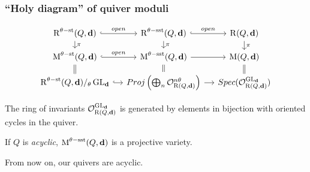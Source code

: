 \documentclass{beamer}
\begin{document}
\begin{frame}
    \frametitle{``Holy diagram'' of quiver moduli}
    \[\begin{tikzcd}[row sep=small, column sep=small, ampersand replacement=\&]
        \parameterspace^{\theta\stable}(Q, \tuple{d}) \arrow[r, hook, "open"] \arrow[d, "\pi"]   \& \parameterspace^{\theta\semistable}(Q, \tuple{d}) \arrow[r, hook, "open"] \arrow[d, "\pi"]                                   \& \parameterspace(Q, \tuple{d}) \arrow[d, "\pi"] \\ 
        \modulispace^{\theta\stable}(Q, \tuple{d}) \arrow[r, hook, "open"] \arrow[d, equal]    \&  \modulispace^{\theta\semistable}(Q, \tuple{d}) \arrow[r] \arrow[d, equal]                                       \& \modulispace(Q, \tuple{d}) \arrow[d, equal] \\
        \parameterspace^{\theta\stable}(Q, \tuple{d}) /_\theta \GL_{\tuple{d}} \arrow[r, hook]           \&  Proj \left(\bigoplus_{n} \mathcal{O}_{\parameterspace(Q, \tuple{d})}^{n\theta}\right) \arrow[r]    \& Spec(\mathcal{O}_{\parameterspace(Q, \tuple{d})}^{\GL_{\tuple{d}}})
    \end{tikzcd} \] \pause
\begin{lemma}
    The ring of invariants $\mathcal{O}^{\operatorname{GL}_{\mathbf{d}}}_{\operatorname{R}(Q, \mathbf{d})}$
    is generated by elements in bijection with oriented cycles in the quiver.
\end{lemma} \pause
\begin{corollary}
    If $Q$ is \emph{acyclic}, $\operatorname{M}^{\theta-\mathrm{sst}}(Q, \mathbf{d})$ is a projective variety.
\end{corollary} \pause
From now on, our quivers are acyclic.
\end{frame}
\end{document}
